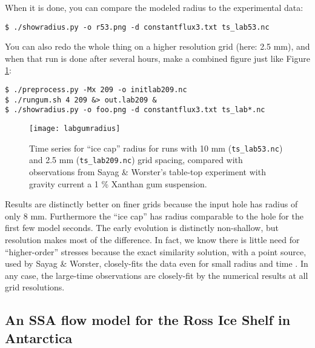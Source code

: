 When it is done, you can compare the modeled radius to the experimental data:
\begin{verbatim}
$ ./showradius.py -o r53.png -d constantflux3.txt ts_lab53.nc
\end{verbatim}%
You can also redo the whole thing on a higher resolution grid (here: 2.5 mm), and when that run is done after several hours, make a combined figure just like Figure \ref{fig:labgumresult}:
\begin{verbatim}
$ ./preprocess.py -Mx 209 -o initlab209.nc
$ ./rungum.sh 4 209 &> out.lab209 &
$ ./showradius.py -o foo.png -d constantflux3.txt ts_lab*.nc
\end{verbatim}%

\begin{figure}[ht]
\centering
\texttt{[image: labgumradius]}
\caption{Time series for ``ice cap'' radius for runs with 10 mm (\texttt{ts_lab53.nc}) and 2.5 mm (\texttt{ts_lab209.nc}) grid spacing, compared with observations from Sayag \& Worster's \cite{SayagWorster2013} table-top experiment with gravity current a 1 \% Xanthan gum suspension.}
\label{fig:labgumresult}
\end{figure}

Results are distinctly better on finer grids because the input hole has radius of only 8 mm.  Furthermore the ``ice cap'' has radius comparable to the hole for the first few model seconds.  The early evolution is distinctly non-shallow, but resolution makes most of the difference.  In fact, we know there is little need for ``higher-order'' stresses because the exact similarity solution, with a point source, used by Sayag \& Worster, closely-fits the data even for small radius and time \cite[Figure 4]{SayagWorster2013}.  In any case, the large-time observations are closely-fit by the numerical results at all grid resolutions.


\subsection{An SSA flow model for the Ross Ice Shelf in Antarctica}\label{sec:ross}   

